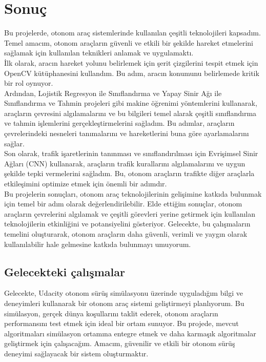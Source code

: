 \documentclass{article}
\begin{document}
\section{Sonuç}
Bu projelerde, otonom araç sistemlerinde kullanılan çeşitli teknolojileri kapsadım. Temel amacım, otonom araçların güvenli ve etkili bir şekilde hareket etmelerini sağlamak için kullanılan teknikleri anlamak ve uygulamaktı.\\[2pt]
İlk olarak, aracın hareket yolunu belirlemek için şerit çizgilerini tespit etmek için OpenCV kütüphanesini kullandım. Bu adım, aracın konumunu belirlemede kritik bir rol oynuyor.\\[2pt]
Ardından, Lojistik Regresyon ile Sınıflandırma ve Yapay Sinir Ağı ile Sınıflandırma ve Tahmin projeleri gibi makine öğrenimi yöntemlerini kullanarak, araçların çevresini algılamalarını ve bu bilgileri temel alarak çeşitli sınıflandırma ve tahmin işlemlerini gerçekleştirmelerini sağladım. Bu adımlar, araçların çevrelerindeki nesneleri tanımalarını ve hareketlerini buna göre ayarlamalarını sağlar.\\[2pt]
Son olarak, trafik işaretlerinin tanınması ve sınıflandırılması için Evrişimsel Sinir Ağları (CNN) kullanarak, araçların trafik kurallarını algılamalarını ve uygun şekilde tepki vermelerini sağladım. Bu, otonom araçların trafikte diğer araçlarla etkileşimini optimize etmek için önemli bir adımdır.\\[2pt]
Bu projelerin sonuçları, otonom araç teknolojilerinin gelişimine katkıda bulunmak için temel bir adım olarak değerlendirilebilir. Elde ettiğim sonuçlar, otonom araçların çevrelerini algılamak ve çeşitli görevleri yerine getirmek için kullanılan teknolojilerin etkinliğini ve potansiyelini gösteriyor. Gelecekte, bu çalışmaların temelini oluşturarak, otonom araçların daha güvenli, verimli ve yaygın olarak kullanılabilir hale gelmesine katkıda bulunmayı umuyorum.
\newpage
\subsection{Gelecekteki çalışmalar}
Gelecekte, Udacity otonom sürüş simülasyonu üzerinde uyguladığım bilgi ve deneyimleri kullanarak bir otonom araç sistemi geliştirmeyi planlıyorum. Bu simülasyon, gerçek dünya koşullarını taklit ederek, otonom araçların performansını test etmek için ideal bir ortam sunuyor. Bu projede, mevcut algoritmaları simülasyon ortamına entegre etmek ve daha karmaşık algoritmalar geliştirmek için çalışacağım. Amacım, güvenilir ve etkili bir otonom sürüş deneyimi sağlayacak bir sistem oluşturmaktır.













\end{document}
